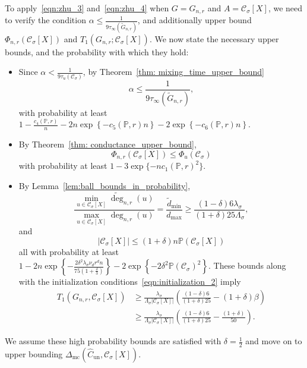 \documentclass[11pt,twoside]{article}
\newcommand{\set}[1]{\left\{#1\right\}}
\newcommand{\abs}[1]{\left \lvert #1 \right \rvert}
\newcommand{\1}{\mathbf{1}}
\newcommand{\Xbf}{X}             %
\newcommand{\Pbb}{\mathbb{P}}
\newcommand{\Cset}{\mathcal{C}}
\newcommand{\Csig}{\Cset_{\sigma}}
\newcommand{\degminwt}{\widetilde{d}_{\min}}
\newcommand{\degmax}{d_{\max}}
\begin{document}
To apply~\eqref{eqn:zhu_3} and~\eqref{eqn:zhu_4} when $G = G_{n,r}$ and $A = \Csig[\Xbf]$, we need to verify the condition $\alpha \leq \frac{1}{9\tau_{\infty}(\widetilde{G}_{n,r})}$, and additionally upper bound $\Phi_{n,r}(\Csig[\Xbf])$ and $T_1(G_{n,r}; \Csig[\Xbf])$. We now state the necessary upper bounds, and the probability with which they hold:
\begin{itemize}
	\item Since $\alpha < \frac{1}{9\tau_u(\Csig)}$, by Theorem~\ref{thm: mixing_time_upper_bound} 
	\begin{equation*}
	\alpha \leq \frac{1}{9\tau_{\infty}(\widetilde{G}_{n,r})},
	\end{equation*}
	with probability at least $1 - \frac{c_4(\Pbb,r)}{n} - 2n\exp\set{-c_5(\Pbb,r)n} - 2\exp\set{-c_6(\Pbb,r)n}$. 
	\item  By Theorem~\ref{thm: conductance_upper_bound}, 
	\begin{equation*}
	\Phi_{n,r}(\Csig[\Xbf]) \leq \Phi_{u}(\Csig) 
	\end{equation*}
	with probability at least $1 - 3\exp\{-nc_1(\Pbb,r)^2\}$. 
	\item By Lemma~\ref{lem:ball_bounds_in_probability},
	\begin{equation*}
	\frac{\min_{u \in \Csig[\Xbf]}\widetilde{\deg}_{n,r}(u)}{\max_{u \in \Csig[\Xbf]}\deg_{n,r}(u)}= \frac{\degminwt}{\degmax} \geq \frac{(1 - \delta)6\lambda_{\sigma}}{(1+\delta)25\Lambda_{\sigma}},
	\end{equation*}
	and
	\begin{equation*}
	\abs{\Csig[\Xbf]} \leq (1 + \delta)n\Pbb(\Csig[\Xbf])
	\end{equation*}
	all with probability at least $1 - 2n\exp\set{-\frac{2 \delta^2 \lambda_{\sigma} \nu_d r^d n}{75(1 + \frac{\delta}{3})}} - 2\exp\set{-2\delta^2 \Pbb(\Csig)^2}$. These bounds along with the initialization conditions~\eqref{eqn:initialization_2} imply
	\begin{align}
	T_1(G_{n,r}, \Csig[\Xbf]) & \geq \frac{\lambda_{\sigma}}{\Lambda_{\sigma}\abs{\Csig[\Xbf]}}\left(\frac{(1 - \delta)6}{(1+\delta)25} - (1 + \delta)\beta\right) \nonumber \\
	& \geq \frac{\lambda_{\sigma}}{\Lambda_{\sigma}\abs{\Csig[\Xbf]}}\left(\frac{(1 - \delta)6}{(1+\delta)25} - \frac{(1 + \delta)}{50}\right). \label{eqn:misclassification_rate_pf1}
	\end{align}
\end{itemize}
We assume these high probability bounds are satisfied with $\delta = \frac{1}{2}$ and move on to upper bounding $\Delta_{\textrm{mc}}(\widehat{C}_{\textrm{un}}, \Csig[\Xbf])$. 
\end{document}

